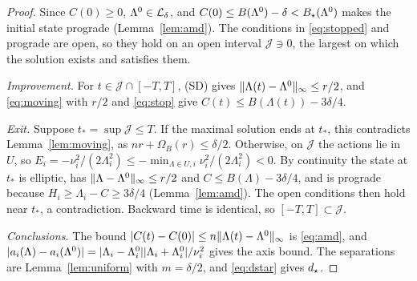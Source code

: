 \begin{proof}
Since $C(0)\ge0$, $\Lambda^0\in\mathcal{L}_\delta$, and $C(0)\le B(\Lambda^0)-\delta<B_\star(\Lambda^0)$ makes the initial state prograde (Lemma~\ref{lem:amd}). The conditions in \eqref{eq:stopped} and prograde are open, so they hold on an open interval $\mathcal J\ni0$, the largest on which the solution exists and satisfies them.

\emph{Improvement.} For $t\in\mathcal J\cap[-T,T]$, (SD) gives $\lVert \Lambda(t)-\Lambda^0\rVert_\infty\le r/2$, and \eqref{eq:moving} with $r/2$ and \eqref{eq:stop} give $C(t)\le B(\Lambda(t))-3\delta/4$.

\emph{Exit.} Suppose $t_*=\sup\mathcal J\le T$. If the maximal solution ends at $t_*$, this contradicts Lemma~\ref{lem:moving}, as $nr+\Omega_B(r)\le\delta/2$. Otherwise, on $\mathcal J$ the actions lie in $U$, so $E_i=-\nu_i^2/(2\Lambda_i^2)\le-\min_{\Lambda\in U,i}\nu_i^2/(2\Lambda_i^2)<0$. By continuity the state at $t_*$ is elliptic, has $\lVert \Lambda-\Lambda^0\rVert_\infty\le r/2$ and $C\le B(\Lambda)-3\delta/4$, and is prograde because $H_i\ge\Lambda_i-C\ge3\delta/4$ (Lemma~\ref{lem:amd}). The open conditions then hold near $t_*$, a contradiction. Backward time is identical, so $[-T,T]\subset\mathcal J$.

\emph{Conclusions.} The bound $\lvert C(t)-C(0)\rvert\le n\lVert \Lambda(t)-\Lambda^0\rVert_\infty$ is \eqref{eq:amd}, and $\lvert a_i(\Lambda)-a_i(\Lambda^0)\rvert=\lvert \Lambda_i-\Lambda^0_i\rvert\lvert \Lambda_i+\Lambda^0_i\rvert/\nu_i^2$ gives the axis bound. The separations are Lemma~\ref{lem:uniform} with $m=\delta/2$, and \eqref{eq:dstar} gives $d_\star$.
\end{proof}

